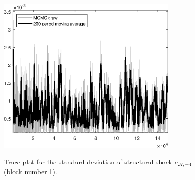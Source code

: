 \begin{figure}[H]
\centering
  \includegraphics[width=0.8\textwidth]{BRS_sectoral_KK/graphs/TracePlot_SE_e_ZI_news_blck_1}\\
    \caption{Trace plot for the standard deviation of structural shock ${e_{ZI,-4}}$ (block number 1).}
\end{figure}
